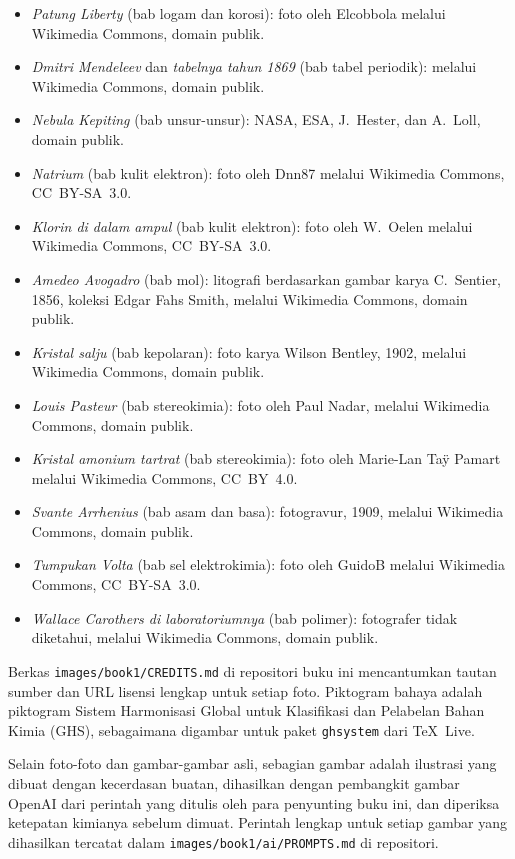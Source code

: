 \begin{itemize}
  \item \emph{Patung Liberty} (bab logam dan korosi): foto oleh
        Elcobbola melalui Wikimedia Commons, domain publik.
  \item \emph{Dmitri Mendeleev} dan \emph{tabelnya tahun 1869} (bab
        tabel periodik): melalui Wikimedia Commons, domain publik.
  \item \emph{Nebula Kepiting} (bab unsur-unsur): NASA, ESA, J.~Hester,
        dan A.~Loll, domain publik.
  \item \emph{Natrium} (bab kulit elektron): foto oleh Dnn87 melalui
        Wikimedia Commons, CC\ BY-SA\ 3.0.
  \item \emph{Klorin di dalam ampul} (bab kulit elektron): foto oleh
        W.~Oelen melalui Wikimedia Commons, CC\ BY-SA\ 3.0.
  \item \emph{Amedeo Avogadro} (bab mol): litografi berdasarkan gambar
        karya C.~Sentier, 1856, koleksi Edgar Fahs Smith, melalui
        Wikimedia Commons, domain publik.
  \item \emph{Kristal salju} (bab kepolaran): foto karya Wilson Bentley,
        1902, melalui Wikimedia Commons, domain publik.
  \item \emph{Louis Pasteur} (bab stereokimia): foto oleh Paul Nadar,
        melalui Wikimedia Commons, domain publik.
  \item \emph{Kristal amonium tartrat} (bab stereokimia): foto oleh
        Marie-Lan Taÿ Pamart melalui Wikimedia Commons, CC\ BY\ 4.0.
  \item \emph{Svante Arrhenius} (bab asam dan basa): fotogravur, 1909,
        melalui Wikimedia Commons, domain publik.
  \item \emph{Tumpukan Volta} (bab sel elektrokimia): foto oleh GuidoB
        melalui Wikimedia Commons, CC\ BY-SA\ 3.0.
  \item \emph{Wallace Carothers di laboratoriumnya} (bab polimer):
        fotografer tidak diketahui, melalui Wikimedia Commons, domain
        publik.
\end{itemize}

Berkas \texttt{images/book1/CREDITS.md} di repositori buku ini
mencantumkan tautan sumber dan URL lisensi lengkap untuk setiap foto.
Piktogram
bahaya adalah piktogram Sistem Harmonisasi Global untuk Klasifikasi dan
Pelabelan Bahan Kimia (GHS), sebagaimana digambar untuk paket
\texttt{ghsystem} dari \TeX\ Live.

\bigskip
Selain foto-foto dan gambar-gambar asli, sebagian gambar adalah
ilustrasi yang dibuat dengan kecerdasan buatan, dihasilkan dengan
pembangkit gambar OpenAI dari perintah yang ditulis oleh para penyunting
buku ini, dan diperiksa ketepatan kimianya sebelum dimuat. Perintah
lengkap untuk setiap gambar yang dihasilkan tercatat dalam
\texttt{images/book1/ai/PROMPTS.md} di repositori.
\clearpage
